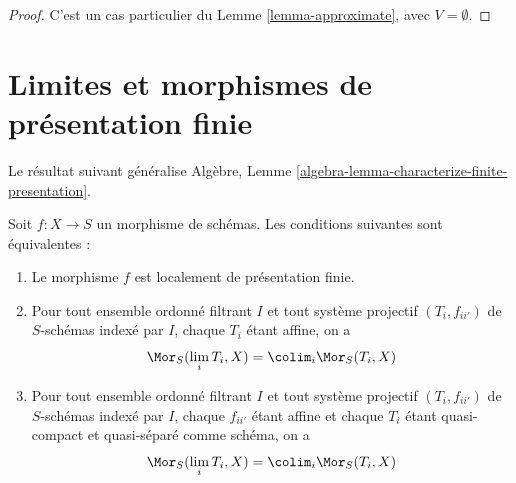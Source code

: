 \begin{proof}
C'est un cas particulier du Lemme \ref{lemma-approximate}, avec
$V = \emptyset$.
\end{proof}






\section{Limites et morphismes de présentation finie}
\label{section-finite-presentation}

\noindent
Le résultat suivant généralise Algèbre,
Lemme \ref{algebra-lemma-characterize-finite-presentation}.

\begin{proposition}
\label{proposition-characterize-locally-finite-presentation}
\begin{reference}
\cite[IV, Proposition 8.14.2]{EGA}
\end{reference}
Soit $f : X \to S$ un morphisme de schémas. Les conditions suivantes sont
équivalentes :
\begin{enumerate}
\item Le morphisme $f$ est localement de présentation finie.
\item Pour tout ensemble ordonné filtrant $I$ et tout système projectif
$(T_i, f_{ii'})$ de $S$-schémas indexé par $I$, chaque $T_i$ étant affine,
on a
$$
\Mor_S(\lim_i T_i, X) =
\colim_i \Mor_S(T_i, X)
$$
\item Pour tout ensemble ordonné filtrant $I$ et tout système projectif
$(T_i, f_{ii'})$ de $S$-schémas indexé par $I$, chaque $f_{ii'}$ étant affine
et chaque $T_i$ étant quasi-compact et quasi-séparé comme schéma, on a
$$
\Mor_S(\lim_i T_i, X) =
\colim_i \Mor_S(T_i, X)
$$
\end{enumerate}
\end{proposition}

